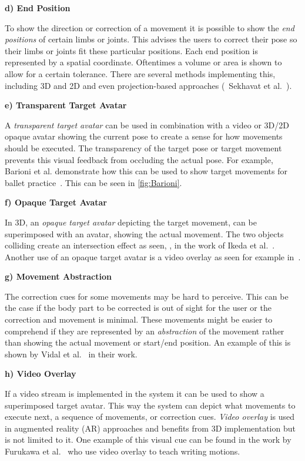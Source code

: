 \textbf{d) End Position}

To show the direction or correction of a movement it is possible to show the \textit{end positions} of certain limbs or joints. This advises the users to correct their pose so their limbs or joints fit these particular positions. Each end position is represented by a spatial coordinate. Oftentimes a volume or area is shown to allow for a certain tolerance. There are several methods implementing this, including 3D and 2D and even projection-based approaches (\eg\ Sekhavat et al.~\cite{sekhavat2018pba}).

\textbf{e) Transparent Target Avatar}

A \textit{transparent target avatar} can be used in combination with a video or 3D/2D opaque avatar showing the current pose to create a sense for how movements should be executed. The transparency of the target pose or target movement prevents this visual feedback from occluding the actual pose. For example, Barioni et al. demonstrate how this can be used to show target movements for ballet practice~\cite{barioni2019bvr}. This can be seen in \autoref{fig:Barioni}.

\textbf{f) Opaque Target Avatar}

In 3D, an \emph{opaque target avatar} depicting the target movement, can be superimposed with an avatar, showing the actual movement. The two objects colliding create an intersection effect as seen, \eg, in the work of Ikeda et al.~\cite{ikeda2018arb}. Another use of an opaque target avatar is a video overlay as seen for example in~\cite{kosmalla2017cvi}.

\textbf{g) Movement Abstraction}

The correction cues for some movements may be hard to perceive. This can be the case if the body part to be corrected is out of sight for the user or the correction and movement is minimal. These movements might be easier to comprehend if they are represented by an \textit{abstraction} of the movement rather than showing the actual movement or start/end position. An example of this is shown by Vidal et al.~\cite{vidal2020blo} in their work.

\textbf{h) Video Overlay}

If a video stream is implemented in the system it can be used to show a superimposed target avatar. This way the system can depict what movements to execute next, a sequence of movements, or correction cues. \textit{Video overlay} is used in augmented reality (AR) approaches and benefits from 3D implementation but is not limited to it. One example of this visual cue can be found in the work by Furukawa et al.~\cite{furukawa2018dar} who use video overlay to teach writing motions.

